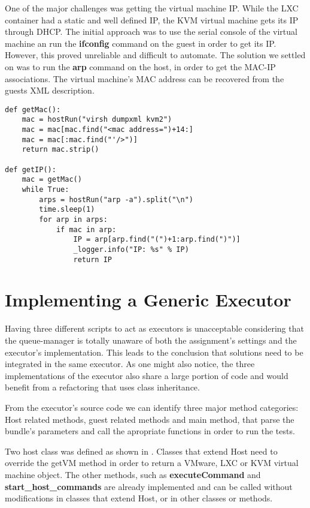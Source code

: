 One of the major challenges was getting the virtual machine IP. While the
LXC container had a static and well defined IP, the KVM virtual machine gets
its IP through DHCP. The initial approach was to use the serial console of 
the virtual machine an run the \textbf{ifconfig} command on the guest in order
to get its IP. However, this proved unreliable and difficult to automate. The
solution we settled on was to run the \textbf{arp} command on the host, in order
to get the MAC-IP associations. The virtual machine's MAC address can be
recovered from the guests XML description.

\lstset{caption=Get the KVM Guest's IP, label=lst:kvm-ip}
\begin{lstlisting}
def getMac():
    mac = hostRun("virsh dumpxml kvm2")
    mac = mac[mac.find("<mac address=")+14:]
    mac = mac[:mac.find("'/>")]
    return mac.strip()
    
def getIP():
    mac = getMac()
    while True:
        arps = hostRun("arp -a").split("\n")
        time.sleep(1)
        for arp in arps:
            if mac in arp:
                IP = arp[arp.find("(")+1:arp.find(")")]
                _logger.info("IP: %s" % IP)
                return IP
\end{lstlisting}
       

\section{Implementing a Generic Executor}
\label{sec:vmc-generic}


Having three different scripts to act as executors is unacceptable considering
that the queue-manager is totally unaware of both the assignment's settings
and the executor's implementation. This leads to the conclusion that solutions
need to be integrated in the same executor. As one might also notice, the
three implementations of the executor also share a large portion of code and
would benefit from a refactoring that uses class inheritance.

From the executor's source code we can identify three major method categories:
Host related methods, guest related methods and main method, that parse the
bundle's parameters and call the apropriate functions in order to run the tests.


Two host class was defined as shown in .
Classes that extend Host need to override the getVM method in order to return a
VMware, LXC or KVM virtual machine object. The other methods, such as \textbf{executeCommand}
and \textbf{start_host_commands} are already implemented and can be called
without modifications in classes that extend Host, or in other classes or methods.

